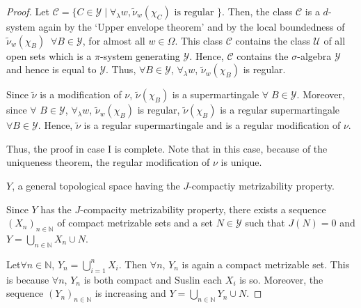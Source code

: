 \begin{proof}
Let $\mathscr{C} = \{C \in \mathscr{Y} \mid \forall_\lambda w,
\tilde{\nu}_w(\chi_C) \text{ is regular }\}$. Then, the class
$\mathscr{C}$  is a $d$-system again by the `Upper envelope theorem'
and by the local boundedness of $\tilde{\nu}_w(\chi_B) \;\; \forall B \in
\mathscr{Y}$, for almost all $w \in \Omega$. This class $\mathscr{C}$
contains the class $\mathcal{U}$ of all open sets which is a
$\pi$-system generating $\mathscr{Y}$. Hence, $\mathscr{C}$ contains
the $\sigma$-algebra $\mathscr{Y}$ and hence is equal to
$\mathscr{Y}$. Thus, $\forall B \in \mathscr{Y}$, $\forall_\lambda w$,
$\tilde{\nu}_w(\chi_B) $ is regular. 

Since $\tilde{\nu}$ is a modification of $\nu$, $\tilde{\nu}(\chi_B)$
is a supermartingale $\forall \; B\in \mathscr{Y}$. Moreover, since
$\forall$ $B \in \mathscr{Y}$, $\forall_\lambda w$,
$\tilde{\nu}_w(\chi_B)$ is regular, $\tilde{\nu}(\chi_B)$ is a regular
supermartingale $\forall B \in \mathscr{Y}$. Hence, $\tilde{\nu}$ is a
regular supermartingale and is a regular modification of $\nu$. 

Thus, the proof in case I is complete. Note that in this case, because
of the uniqueness theorem, the regular modification of $\nu$ is
unique. 

\medskip
{} $Y$, a general topological space having
the $J$-compactiy metrizability property.

Since $Y$ has the $J$-compacity metrizability property, there exists a
sequence $(X_n)_{n \in \mathbb{N}}$ of compact metrizable sets and
a set $N \in \mathscr{Y}$ such that $J(N) = 0$ and $Y =
\bigcup\limits_{n\in \mathbb{N}} X_n \cup N$. 

Let\pageoriginale $\forall n \in \mathbb{N}$, $Y_n =
\bigcup\limits^n_{i=1} X_i$. Then $\forall n$, $Y_n$ is again a
compact metrizable set. This is because $\forall n$, $Y_n$ is both
compact and Suslin each $X_i$ is so. Moreover, the sequence $(Y_n)_{n
  \in \mathbb{N}}$ is increasing and $Y = \bigcup\limits_{n \in
  \mathbb{N}} Y_n \cup N$. 



\end{proof}
